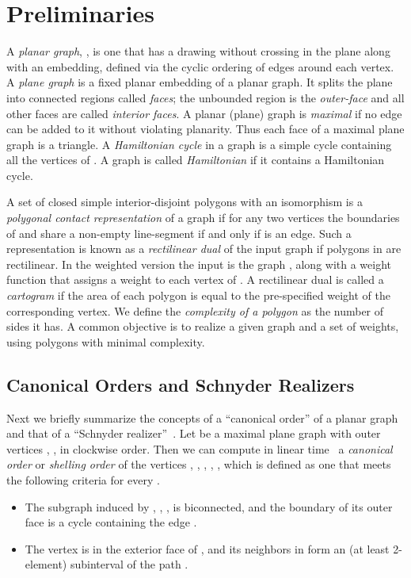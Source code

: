 \documentclass[11pt]{article}
\begin{document}
\section{Preliminaries}
\label{sec:prelim}

A {\em planar graph}, , is one that has a drawing without
crossing in the plane along with an embedding, defined via the cyclic ordering
of edges around each vertex. A {\em plane graph} is a fixed planar embedding of a planar graph.
It splits the plane into connected regions called {\em faces}; the unbounded region
is the {\em outer-face} and all other faces are called {\em interior faces}. A
planar (plane) graph is \textit{maximal} if no edge can be added to it without violating planarity.
Thus each face of a maximal plane graph is a triangle. A \textit{Hamiltonian cycle}
in a graph  is a simple cycle containing all the vertices of . A graph  is
called \textit{Hamiltonian} if it contains a Hamiltonian cycle.

A set  of closed simple
 interior-disjoint polygons with an isomorphism
  is a {\em polygonal contact
representation} of a graph
if for any two vertices
  the boundaries of  and  share a non-empty
 line-segment if and only if  is an edge.
Such a representation is known
 as a {\em rectilinear dual} of the input graph if polygons in  are
 rectilinear.
 In the weighted version the input is the graph , along with a weight function  that
 assigns a weight to each vertex of . A rectilinear dual is called a \textit{cartogram} if the area
 of each polygon is equal to the pre-specified weight of the corresponding vertex.
 We define the \textit{complexity of a polygon} as the number of sides it has.
A common objective is to realize a given graph and a set of weights,
using polygons with minimal complexity.

\subsection{Canonical Orders and Schnyder Realizers}

Next we briefly summarize the concepts of a ``canonical order'' of a
planar graph~\cite{fpp-hdpgg-90} and that of a  ``Schnyder  realizer''~\cite{s-epgg-90}.
Let  be a maximal plane graph with outer vertices , ,  in clockwise order. Then
 we can compute in linear time~\cite{cp-ltadp-95} a \textit{canonical order} or \textit{shelling order} of
 the vertices , , , , , which is defined as one that meets the
 following criteria for every .

\begin{itemize}
    \item The subgraph  induced by , , ,  is
     biconnected, and the boundary of its outer face is a cycle  containing the edge
     .
    \item The vertex  is in the exterior face of , and its neighbors in 
    form an (at least 2-element) subinterval of the path .
\end{itemize}
\end{document}

